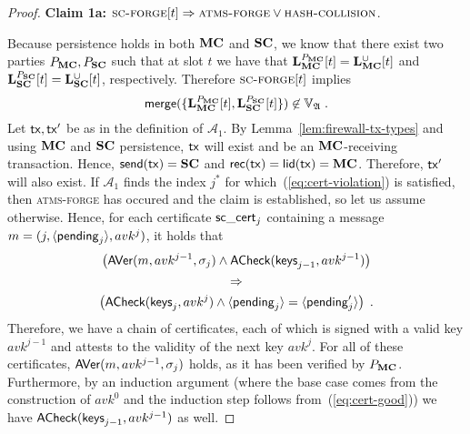 \begin{proof}
  \textbf{Claim 1a:}
  $\textsc{sc-forge}[t] \Rightarrow \textsc{atms-forge} \lor \textsc{hash-collision}$.

  \noindent
  Because persistence holds in both $\mathbf{MC}$ and $\mathbf{SC}$, we know that there exist two parties $P_{\mathbf{MC}}, P_{\mathbf{SC}}$
  such that at slot $t$ we have that $\mathbf{L}_{\mathbf{MC}}^{P_{\mathbf{MC}}}[t] =
  \mathbf{L}_{\mathbf{MC}}^{\cup}[t]$ and $\mathbf{L}_{\mathbf{SC}}^{P_{\mathbf{SC}}}[t] =
  \mathbf{L}_{\mathbf{SC}}^{\cup}[t]$,
  respectively. Therefore $\textsc{sc-forge}[t]$ implies
  $$
    \mathsf{merge}(\{
      \mathbf{L}_{\mathbf{MC}}^{P_{\mathbf{MC}}}[t],
      \mathbf{L}_{\mathbf{SC}}^{P_{\mathbf{SC}}}[t]
    \}) \not\in \mathbb{V}_{\mathfrak{A}}
  \; .
  $$
  Let $\mathsf{tx}, \mathsf{tx}'$ be as in the definition of
  $\mathcal{A}_1$.
  By Lemma~\ref{lem:firewall-tx-types} and using $\mathbf{MC}$ and $\mathbf{SC}$
  persistence, $\mathsf{tx}$ will exist and
  be an $\mathbf{MC}$-receiving transaction.
  Hence, $\mathsf{send}(\mathsf{tx}) = \mathbf{SC}$ and $\mathsf{rec}(\mathsf{tx}) = \mathsf{lid}(\mathsf{tx}) = \mathbf{MC}$.
  Therefore, $\mathsf{tx}'$ will also exist.
  If $\mathcal{A}_1$ finds the index $j^*$ for which~(\ref{eq:cert-violation})
  is satisfied,
  then \textsc{atms-forge} has occured and the claim is established, so let us assume otherwise.
  Hence, for each certificate
  $\mathsf{sc\_cert}_j$ containing a message $m = (j,\langle\mathsf{pending}_j\rangle, avk^j)$, it
  holds that
  \begin{equation}
    \label{eq:cert-good}
    \begin{gathered}
    \left(
      \textsf{AVer}(m, avk^{j-1}, \sigma_j)
      \land
      \textsf{ACheck}(\textsf{keys}_{j-1}, avk^{j-1})
    \right)\\
    \Rightarrow\\
    \left(
      \textsf{ACheck}(\textsf{keys}_j, avk^j)
      \land
      \langle\mathsf{pending}_j\rangle = \langle\mathsf{pending}'_j\rangle
    \right)
    \; .
    \end{gathered}
  \end{equation}
  Therefore, we have a chain of certificates, each of which is signed with a
  valid key $avk^{j-1}$ and attests to the validity of the next key $avk^j$.
  For all of these certificates, $\textsf{AVer}(m,\allowbreak avk^{j-1},\allowbreak \sigma_j)$ holds,
  as it has been verified by $P_{\mathbf{MC}}$.
  Furthermore, by an induction argument (where the base case comes from the
  construction of $avk^0$ and the induction step follows
  from~(\ref{eq:cert-good})) we have
  $\textsf{ACheck}(\textsf{keys}_{j-1}, avk^{j-1})$ as well.


\end{proof}
